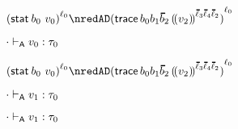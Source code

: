 {\begin{lamportproof*}
    \begin{pfproof}
        \begin{pfproof}
          \qedstep
            \begin{pfproof}
              \(\obars{\estab{\sbnd_0}{\svalue_0}}{\sowner_0}
                \nredAD
                \obars{\eprehist{\fconcat{\sbnd_0}{\sbnd_1}{\sblist_2}}{\obbars{\svalue_2}{\fconcat{\sownerlist_3}{\fconcat{\sownerlist_4}{\sownerlist_2}}}}}{\sowner_0}
              \)
            \end{pfproof}
        \end{pfproof}
        \begin{pfproof}
          \absurdstep
            \begin{pfproof}
              ${\cdot} \vdash_{\mathsf{A}} v_0 : \tau_0$
            \end{pfproof}
        \end{pfproof}
        \begin{pfproof}
            \begin{pfproof}
              \(\obars{\estab{\sbnd_0}{\svalue_0}}{\sowner_0}
                \nredAD
                \obars{\eprehist{\fconcat{\sbnd_0}{\fconcat{\sbnd_1}{\sblist_2}}}{\obbars{\svalue_2}{\fconcat{\sownerlist_3}{\fconcat{\sownerlist_4}{\sownerlist_2}}}}}{\sowner_0}
              \)
            \end{pfproof}
            \begin{pfproof}
              \absurdstep
                \begin{pfproof}
                  ${\cdot} \vdash_{\mathsf{A}} v_1 : \tau_0$
                \end{pfproof}
            \end{pfproof}
        \end{pfproof}
        \begin{pfproof}
          \absurdstep
            \begin{pfproof}
              ${\cdot} \vdash_{\mathsf{A}} v_1 : \tau_0$
            \end{pfproof}
        \end{pfproof}
    \end{pfproof}


\end{lamportproof*}}
